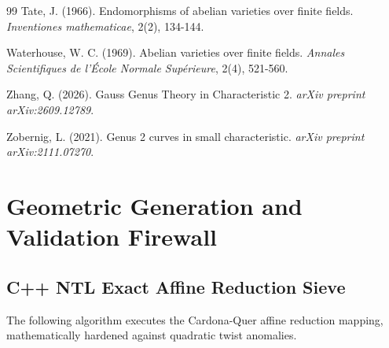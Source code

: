 \documentclass[11pt,letterpaper]{article}
\begin{document}
\begin{thebibliography}{99}
Tate, J. (1966). Endomorphisms of abelian varieties over finite fields. \textit{Inventiones mathematicae}, 2(2), 134-144.

Waterhouse, W. C. (1969). Abelian varieties over finite fields. \textit{Annales Scientifiques de l'\'{E}cole Normale Sup\'{e}rieure}, 2(4), 521-560.

Zhang, Q. (2026). Gauss Genus Theory in Characteristic 2. \textit{arXiv preprint arXiv:2609.12789}.

Zobernig, L. (2021). Genus 2 curves in small characteristic. \textit{arXiv preprint arXiv:2111.07270}.

\end{thebibliography}

\appendix
\section{Geometric Generation and Validation Firewall}
\subsection{C++ NTL Exact Affine Reduction Sieve}
The following algorithm executes the Cardona-Quer affine reduction mapping, mathematically hardened against quadratic twist anomalies.
\end{document}
